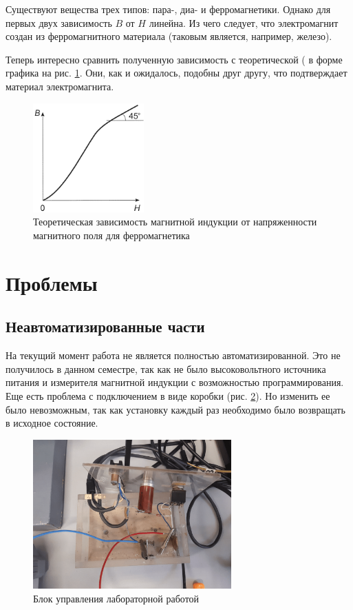 \documentclass[a4paper,12pt]{article} %
\begin{document}
Существуют вещества трех типов: пара-, диа- и ферромагнетики. Однако для первых двух зависимость $B$ от $H$ линейна. Из чего следует, что электромагнит создан из ферромагнитного материала (таковым является, например, железо). 

Теперь интересно сравнить полученную зависимость с теоретической ( в форме графика на рис. \ref{фер}. Они, как и ожидалось, подобны друг другу, что подтверждает материал электромагнита. 

\begin{figure}[h!]
\begin{center}
\includegraphics[width=0.38\textwidth]{ферро}
\caption{Теоретическая зависимость магнитной индукции от напряженности магнитного поля для ферромагнетика} \label{фер}
\end{center}
\end{figure}


\section{Проблемы}
\subsection*{Неавтоматизированные части}
На текущий момент работа не является полностью автоматизированной. Это не получилось в данном семестре, так как не было высоковольтного источника питания и измерителя магнитной индукции с возможностью программирования. Еще есть проблема с подключением в виде коробки (рис. \ref{коробка}). Но изменить ее было невозможным, так как установку каждый раз необходимо было возвращать в исходное состояние. 

\begin{figure}[h!]
\begin{center}
\includegraphics[width=0.68\textwidth]{corob}
\caption{Блок управления лабораторной работой} \label{коробка}
\end{center}
\end{figure}
\end{document}
